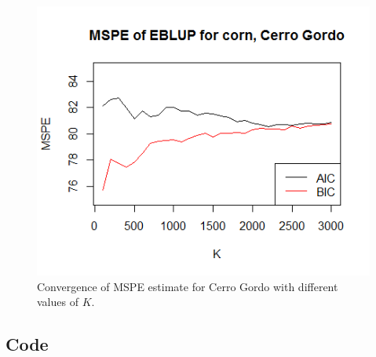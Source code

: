 \documentclass{article}
\begin{document}
\begin{figure}[H]
	\centering
	\includegraphics[scale=0.8]{montecarlo}
	\caption{Convergence of MSPE estimate for Cerro Gordo with different values of $K$.}
	\label{montecarlo}
\end{figure}

\subsection{Code}
\end{document}
